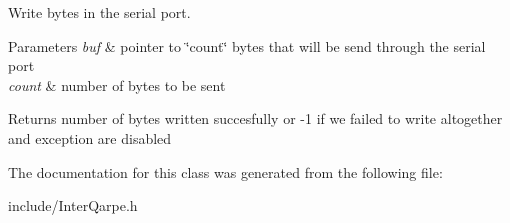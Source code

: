 Write bytes in the serial port. 


\begin{DoxyParams}{Parameters}
{\em buf} & pointer to \char`\"{}count\char`\"{} bytes that will be send through the serial port \\
\hline
{\em count} & number of bytes to be sent\\
\hline
\end{DoxyParams}
\begin{DoxyReturn}{Returns}
number of bytes written succesfully or -\/1 if we failed to write altogether and exception are disabled 
\end{DoxyReturn}


The documentation for this class was generated from the following file\+:\begin{DoxyCompactItemize}
\item 
include/Inter\+Qarpe.\+h\end{DoxyCompactItemize}
